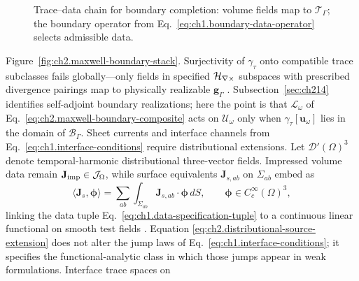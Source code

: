 \begin{figure}[t]
\centering
{}
\caption{Trace--data chain for boundary completion: volume fields map to
\(\mathcal{T}_\Gamma\); the boundary operator from
Eq.~\eqref{eq:ch1.boundary-data-operator} selects admissible data.}
\label{fig:ch2.trace-boundary-chain}
\end{figure}
Figure~\ref{fig:ch2.maxwell-boundary-stack}.
Surjectivity of \(\gamma_\tau\) onto
compatible trace subclasses fails globally---only fields in specified
\(\mathcal{H}_{\nabla\times}\) subspaces with prescribed divergence pairings map to physically realizable
\(\mathbf{g}_\Gamma\) \cite{stratton1941}. Subsection~\ref{sec:ch214} identifies
self-adjoint boundary realizations; here the point is that \(\mathcal{L}_\omega\) of
Eq.~\eqref{eq:ch2.maxwell-boundary-composite} acts on \(\mathcal{U}_\omega\) only when
\(\gamma_\tau[\mathbf{u}_\omega]\) lies in the domain of \(\mathcal{B}_\Gamma\). Sheet currents and interface channels from Eq.~\eqref{eq:ch1.interface-conditions}
require distributional extensions. Let \(\mathcal{D}'(\Omega)^{3}\) denote
temporal-harmonic distributional three-vector fields. Impressed volume data remain
\(\mathbf{J}_{\mathrm{imp}}\in\mathcal{J}_\Omega\), while surface equivalents \(\mathbf{J}_{s,ab}\) on
\(\Sigma_{ab}\) embed as
\begin{equation}
\label{eq:ch2.distributional-source-extension}
\langle\mathbf{J}_{s},\boldsymbol{\phi}\rangle
=
\sum_{ab}\int_{\Sigma_{ab}}\mathbf{J}_{s,ab}\cdot\boldsymbol{\phi}\,dS,
\qquad
\boldsymbol{\phi}\in C_c^\infty(\Omega)^{3},
\end{equation}
linking the data tuple Eq.~\eqref{eq:ch1.data-specification-tuple} to a continuous
linear functional on smooth test fields \cite{stratton1941}. Equation
\eqref{eq:ch2.distributional-source-extension} does not alter the jump laws of
Eq.~\eqref{eq:ch1.interface-conditions}; it specifies the functional-analytic class
in which those jumps appear in weak formulations. Interface trace spaces on

